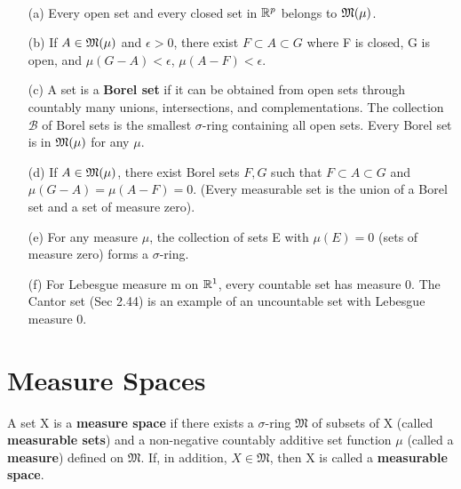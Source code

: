 \begin{remark}
  \label{rem:chap11:measurable_properties}
  ~ %
  \begin{itemize}
    \item[(a)] Every open set and every closed set in $\mathbb{R}^p$ belongs
      to $\mathfrak{M}(\mu)$.
    \item[(b)] If $A \in \mathfrak{M}(\mu)$ and $\epsilon > 0$, there
      exist $F \subset A \subset G$ where F is closed, G is open, and
      $\mu(G-A) < \epsilon$, $\mu(A-F) < \epsilon$.
    \item[(c)] A set is a \textbf{Borel set} if it can be obtained
      from open sets through countably many unions, intersections,
      and complementations. The collection $\mathcal{B}$ of Borel
      sets is the smallest $\sigma$-ring containing all open sets.
      Every Borel set is in $\mathfrak{M}(\mu)$ for any $\mu$.
    \item[(d)] If $A \in \mathfrak{M}(\mu)$, there exist Borel sets
      $F, G$ such that $F \subset A \subset G$ and $\mu(G-A) =
      \mu(A-F) = 0$. (Every measurable set is the union of a Borel
      set and a set of measure zero).
    \item[(e)] For any measure $\mu$, the collection of sets E with
      $\mu(E)=0$ (sets of measure zero) forms a $\sigma$-ring.
    \item[(f)] For Lebesgue measure m on $\mathbb{R}^1$, every countable set
      has measure 0. The Cantor set (Sec 2.44) is an example of an
      uncountable set with Lebesgue measure 0.
  \end{itemize}
\end{remark}



\section{Measure Spaces}

\begin{definition}
  \label{def:chap11:measure_space}
  A set X is a \textbf{measure space} if there exists a $\sigma$-ring
  $\mathfrak{M}$ of subsets of X (called \textbf{measurable sets})
  and a non-negative countably additive set function $\mu$ (called a
  \textbf{measure}) defined on $\mathfrak{M}$.
  If, in addition, $X \in \mathfrak{M}$, then X is called a
  \textbf{measurable space}.
\end{definition}


